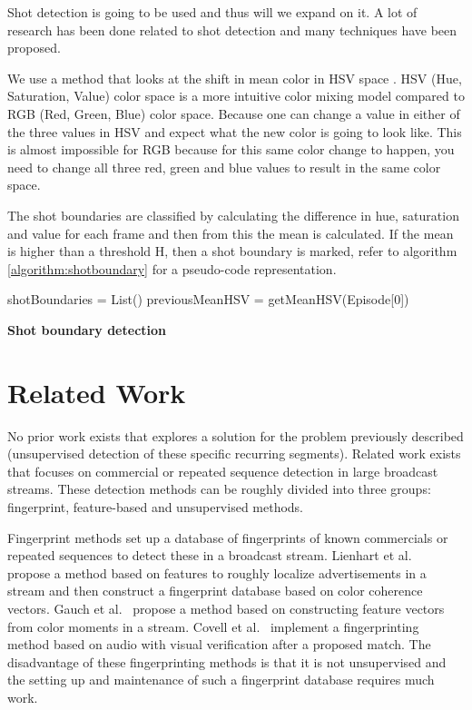 \documentclass{article}
\begin{document}
Shot detection is going to be used and thus will we expand on it. A lot of research has been done related to shot detection \cite{lienhart1998comparison} and many techniques have been proposed. 

We use a method that looks at the shift in mean color in HSV space \cite{shao2015shot}. HSV (Hue, Saturation, Value) color space is a more intuitive color mixing model compared to RGB (Red, Green, Blue) color space. Because one can change a value in either of the three values in HSV and expect what the new color is going to look like. This is almost impossible for RGB because for this same color change to happen, you need to change all three red, green and blue values to result in the same color space.

The shot boundaries are classified by calculating the difference in hue, saturation and value for each frame and then from this the mean is calculated. If the mean is higher than a threshold H, then a shot boundary is marked, refer to algorithm \ref{algorithm:shotboundary} for a pseudo-code representation.

\begin{algorithm}[H] 
	\SetAlgoLined
	shotBoundaries = List()\;
	previousMeanHSV = getMeanHSV(Episode[0])\;
	\caption{\textbf{Shot boundary detection}}
	\label{algorithm:shotboundary}
\end{algorithm}

\section{Related Work} \label{relatedwork}

No prior work exists that explores a solution for the problem previously described (unsupervised detection of these specific recurring segments). Related work exists that focuses on commercial or repeated sequence detection in large broadcast streams. These detection methods can be roughly divided into three groups: fingerprint, feature-based and unsupervised methods. 

Fingerprint methods set up a database of fingerprints of known commercials or repeated sequences to detect these in a broadcast stream. Lienhart et al.\ \cite{lienhart1997detection} propose a method based on features to roughly localize advertisements in a stream and then construct a fingerprint database based on color coherence vectors. Gauch et al.\ \cite{gauch2006finding} propose a method based on constructing feature vectors from color moments in a stream. Covell et al.\ \cite{covell2006advertisement} implement a fingerprinting method based on audio with visual verification after a proposed match. The disadvantage of these fingerprinting methods is that it is not unsupervised and the setting up and maintenance of such a fingerprint database requires much work.
\end{document}
